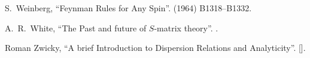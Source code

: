 \begin{thebibliography}{99}
S.~Weinberg,
``Feynman Rules for Any Spin''.
  (1964) B1318--B1332.\newline
{\tt{}}

A.~R.~White,
``The Past and future of $S$-matrix theory''.
.

Roman Zwicky,
``A brief Introduction to Dispersion Relations and Analyticity''.
{\tt{}}
[].

\end{thebibliography}
